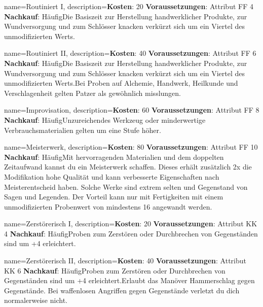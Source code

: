 {
    name={Routiniert I},
    description={\textbf{Kosten}: 20 \textbf{Voraussetzungen}: Attribut FF 4 \textbf{Nachkauf}: Häufig\newline Die Basiszeit zur Herstellung handwerklicher Produkte, zur Wundversorgung und zum Schlösser knacken verkürzt sich um ein Viertel des unmodifizierten Werts.}
}


{
    name={Routiniert II},
    description={\textbf{Kosten}: 40 \textbf{Voraussetzungen}: Attribut FF 6 \textbf{Nachkauf}: Häufig\newline Die Basiszeit zur Herstellung handwerklicher Produkte, zur Wundversorgung und zum Schlösser knacken verkürzt sich um ein Viertel des unmodifizierten Werts.\newline Bei Proben auf Alchemie, Handwerk, Heilkunde und Verschlagenheit gelten Patzer als gewöhnlich misslungen.}
}


{
    name={Improvisation},
    description={\textbf{Kosten}: 60 \textbf{Voraussetzungen}: Attribut FF 8 \textbf{Nachkauf}: Häufig\newline Unzureichendes Werkzeug oder minderwertige Verbrauchsmaterialien gelten um eine Stufe höher.}
}


{
    name={Meisterwerk},
    description={\textbf{Kosten}: 80 \textbf{Voraussetzungen}: Attribut FF 10 \textbf{Nachkauf}: Häufig\newline Mit hervorragenden Materialien und dem doppelten Zeitaufwand kannst du ein Meisterwerk schaffen. Dieses erhält zusätzlich 2x die Modifikation hohe Qualität und kann verbesserte Eigenschaften nach Meisterentscheid haben. Solche Werke sind extrem selten und Gegenstand von Sagen und Legenden. Der Vorteil kann nur mit Fertigkeiten mit einem unmodifizierten Probenwert von mindestens 16 angewandt werden. }
}


{
    name={Zerstörerisch I},
    description={\textbf{Kosten}: 20 \textbf{Voraussetzungen}: Attribut KK 4 \textbf{Nachkauf}: Häufig\newline Proben zum Zerstören oder Durchbrechen von Gegenständen sind um +4 erleichtert.}
}


{
    name={Zerstörerisch II},
    description={\textbf{Kosten}: 40 \textbf{Voraussetzungen}: Attribut KK 6 \textbf{Nachkauf}: Häufig\newline Proben zum Zerstören oder Durchbrechen von Gegenständen sind um +4 erleichtert.\newline Erlaubt das Manöver Hammerschlag gegen Gegenstände. Bei waffenlosen Angriffen gegen Gegenstände verletzt du dich normalerweise nicht.}
}



